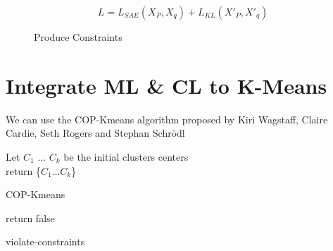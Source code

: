 \documentclass{article}
\begin{document}
\begin{equation}\label{eq:loss_FINALE}
  L = L_{SAE}(X_P, X_q) + L_{KL}(X'_P, X'_q)
\end{equation}

\begin{figure}[!t]
  \centering
  
  \caption{Produce Constraints}
  \label{fig:final_archi}
\end{figure}

\section{Integrate ML \& CL to K-Means}

We can use the COP-Kmeans algorithm proposed by Kiri Wagstaff, Claire
Cardie, Seth Rogers and Stephan Schr\"odl
\cite{Wagstaff:2001:CKC:645530.655669} 

\begin{algorithm}[H]
  Let $C_1$ ... $C_k$ be the initial clusters centers\\
  return \{$C_1$...$C_k$\}
  \caption{COP-Kmeans}
\end{algorithm} 
\begin{algorithm}[H]
  return false
  \caption{violate-constraints}
\end{algorithm} 

\nocite{*}
\printbibliography[title=References]
\end{document}

